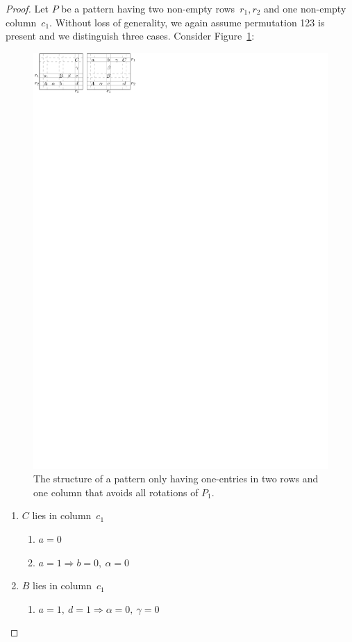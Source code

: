 \begin{proof}
Let $P$ be a pattern having two non-empty rows~$r_1,r_2$ and one non-empty column~$c_1$. Without loss of generality, we again assume permutation 123 is present and we distinguish three cases. Consider Figure~\ref{fig:twoplusone}:
\begin{figure}[!ht]
	\centering
	\includegraphics[width=120mm]{img/twoplusone.pdf}
	\caption{The structure of a pattern only having one-entries in two rows and one column that avoids all rotations of $P_1$.}
	\label{fig:twoplusone}
\end{figure}
\begin{enumerate}
\item $C$ lies in column~$c_1$
	\begin{enumerate}
		\item $a=0$
		\item $a=1\Rightarrow b=0,\ \alpha=0$
	\end{enumerate}
\item $B$ lies in column~$c_1$
	\begin{enumerate}
		\item $a=1,\ d=1\Rightarrow\alpha=0,\ \gamma=0$

\end{enumerate}
\end{enumerate}
\end{proof}
